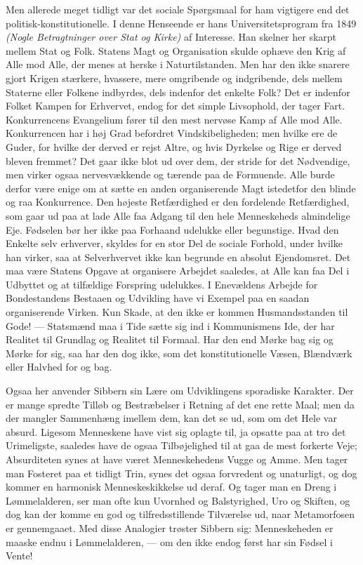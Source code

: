 \documentclass[12pt,a4paper,openany]{book}
\newcommand{\opage}[1]{\marginnote{\footnotesize\textit{[#1]}}}
\begin{document}
Men allerede meget tidligt var det sociale Spørgsmaal for ham vigtigere end det
politisk-konstitutionelle. I denne Henseende er hans Universitetsprogram fra
1849 \textit{(Nogle Betragtninger over Stat og Kirke)} af Interesse. Han
skelner her skarpt mellem Stat og Folk. Statens Magt og Organisation skulde
ophæve den Krig af Alle mod Alle, der menes at herske i Naturtilstanden. Men
har den ikke snarere gjort Krigen stærkere, hvassere, mere omgribende og
indgribende, dels mellem Staterne eller Folkene indbyrdes, dels indenfor det
enkelte Folk? Det er indenfor Folket Kampen for Erhvervet, endog for det simple
Livsophold, der tager Fart. Konkurrencens Evangelium fører til den mest nervøse
Kamp af Alle mod Alle. Konkurrencen har i høj Grad befordret Vindskibeligheden;
men hvilke ere de Guder, for hvilke der derved er rejst Altre, og hvis Dyrkelse
og Rige er derved bleven fremmet? Det gaar ikke blot ud over dem, der stride
for det Nødvendige, men virker ogsaa nervesvækkende og tærende paa de
Formuende. Alle burde derfor være enige om at
\setcounter{footnote}{0}%
\opage{114}sætte en anden organiserende Magt istedetfor den blinde og raa
Konkurrence. Den højeste Retfærdighed er den fordelende Retfærdighed, som gaar
ud paa at lade Alle faa Adgang til den hele Menneskeheds almindelige Eje.
Fødselen bør her ikke paa Forhaand udelukke eller begunstige. Hvad den Enkelte
selv erhverver, skyldes for en stor Del de sociale Forhold, under hvilke han
virker, saa at Selverhvervet ikke kan begrunde en absolut Ejendomsret. Det maa
være Statens Opgave at organisere Arbejdet saaledes, at Alle kan faa Del i
Udbyttet og at tilfældige Forspring udelukkes. I Enevældens Arbejde for
Bondestandens Bestaaen og Udvikling have vi Exempel paa en saadan organiserende
Virken. Kun Skade, at den ikke er kommen Husmandsstanden til Gode! ---
Statsmænd maa i Tide sætte sig ind i Kommunismens Ide, der har Realitet til
Grundlag og Realitet til Formaal. Har den end Mørke bag sig og Mørke for sig,
saa har den dog ikke, som det konstitutionelle Væsen, Blændværk eller Halvhed
for og bag.

Ogsaa her anvender Sibbern sin Lære om Udviklingens sporadiske Karakter. Der er
mange spredte Tilløb og Bestræbelser i Retning af det ene rette Maal; men da
der mangler Sammenhæng imellem dem, kan det se ud, som om det Hele var absurd.
Ligesom Menneskene have vist sig oplagte til, ja opsatte paa at tro det
Urimeligste, saaledes have de ogsaa Tilbøjelighed til at gaa de mest forkerte
Veje; Absurditeten synes at have været Menneskehedens Vugge og Amme. Men tager
man Fosteret paa et tidligt Trin, synes det ogsaa forvredent og unaturligt, og
dog kommer en harmonisk Menneskeskikkelse ud deraf. Og tager man en Dreng i
Lømmelalderen, ser man ofte kun Uvornhed og Balstyrighed, Uro og Skiften, og
dog kan der komme en god og tilfredsstillende Tilværelse ud, naar Metamorfosen
er gennemgaaet. Med disse Analogier trøster Sibbern sig: Menneskeheden er
maaske endnu i Lømmelalderen, --- om den ikke endog først har sin Fødsel i Vente!
\end{document}
